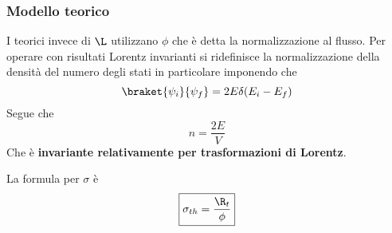 \documentclass[12pt]{book}
\begin{document}
\subsubsection{Modello teorico}
I teorici invece di $\L$ utilizzano $\phi$ che è detta la normalizzazione al flusso. Per operare con risultati Lorentz invarianti si ridefinisce la normalizzazione della densità del numero degli stati in particolare imponendo che 
\begin{equation}
	\braket{\psi_i}{\psi_f}=2E \delta (E_i-E_f)
\end{equation}
Segue che
\begin{equation}
	n =\frac{2E}{V}
\end{equation}
Che è \textbf{invariante relativamente per trasformazioni di Lorentz}. 


La formula per $\sigma$ è 
\begin{equation}
	\boxed{\sigma_{th} = \frac{\R_t}{\phi}}
\end{equation}
\end{document}
